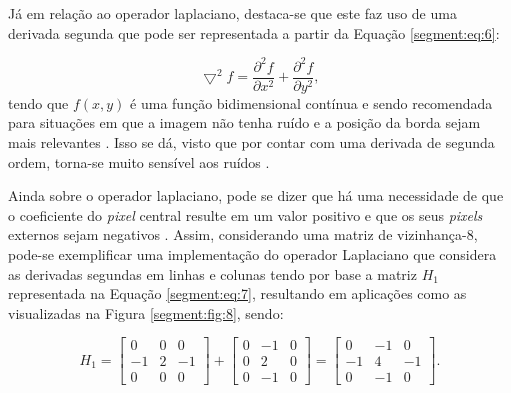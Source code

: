 Já em relação ao operador laplaciano, destaca-se que este faz uso de uma derivada segunda que pode ser representada a partir da Equação \ref{segment:eq:6}:

\begin{equation}
    \label{segment:eq:6}
    \bigtriangledown^2 f = \frac{\partial^2f}{\partial x^2} + \frac{\partial^2f}{\partial y^2},
\end{equation}
tendo que $f(x,y)$ é uma função bidimensional contínua e sendo recomendada para situações em que a imagem não tenha ruído e a posição da borda sejam mais relevantes \citep{Yuheng2017}. Isso se dá, visto que por contar com uma derivada de segunda ordem, torna-se muito sensível aos ruídos \citep{pedrini2008analise}.

Ainda sobre o operador laplaciano, pode se dizer que há uma necessidade de que o coeficiente do \textit{pixel} central resulte em um valor positivo e que os seus \textit{pixels} externos sejam negativos \citep{pedrini2008analise}. Assim, considerando uma matriz de vizinhança-8, pode-se exemplificar uma implementação do operador Laplaciano que considera as derivadas segundas em linhas e colunas tendo por base a matriz $H_1$ representada na Equação \ref{segment:eq:7}, resultando em aplicações como as visualizadas na Figura \ref{segment:fig:8}, sendo: 

\begin{equation}
    \label{segment:eq:7}
    H_1 = \begin{bmatrix}
     0 &  0 &  0 \\ 
    -1 &  2 & -1 \\ 
     0 &  0 &  0
    \end{bmatrix} +
    \begin{bmatrix}
     0 & -1 & 0 \\ 
     0 &  2 & 0 \\ 
     0 & -1 & 0 
    \end{bmatrix} =
    \begin{bmatrix}
     0 & -1 & 0 \\ 
    -1 &  4 & -1 \\ 
     0 & -1 & 0 
    \end{bmatrix}.
\end{equation}

